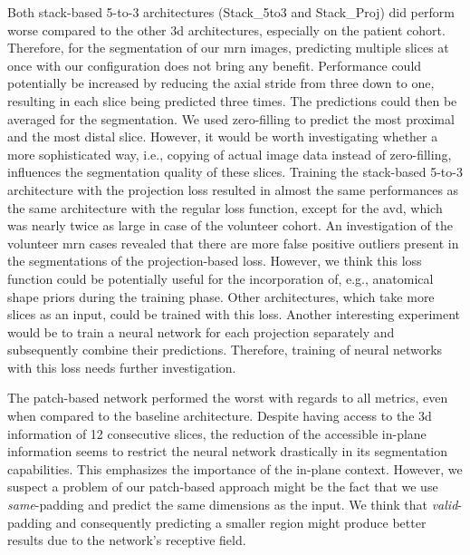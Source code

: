 Both stack-based 5-to-3 architectures (Stack\_5to3 and Stack\_Proj) did perform worse compared to the other \gls{3d} architectures, especially on the patient cohort. Therefore, for the segmentation of our \gls{mrn} images, predicting multiple slices at once with our configuration does not bring any benefit. Performance could potentially be increased by reducing the axial stride from three down to one, resulting in each slice being predicted three times. The predictions could then be averaged for the segmentation. We used zero-filling to predict the most proximal and the most distal slice. However, it would be worth investigating whether a more sophisticated way, i.e., copying of actual image data instead of zero-filling, influences the segmentation quality of these slices.
Training the stack-based 5-to-3 architecture with the projection loss resulted in almost the same performances as the same architecture with the regular loss function, except for the \acrlong{avd}, which was nearly twice as large in case of the volunteer cohort. An investigation of the volunteer \gls{mrn} cases revealed that there are more false positive outliers present in the segmentations of the projection-based loss. However, we think this loss function could be potentially useful for the incorporation of, e.g., anatomical shape priors during the training phase. Other architectures, which take more slices as an input, could be trained with this loss. Another interesting experiment would be to train a neural network for each projection separately and subsequently combine their predictions. Therefore, training of neural networks with this loss needs further investigation.

The patch-based network performed the worst with regards to all metrics, even when compared to the baseline architecture. Despite having access to the \gls{3d} information of 12 consecutive slices, the reduction of the accessible in-plane information seems to restrict the neural network drastically in its segmentation capabilities. This emphasizes the importance of the in-plane context. However, we suspect a problem of our patch-based approach might be the fact that we use \textit{same}-padding and predict the same dimensions as the input. We think that \textit{valid}-padding and consequently predicting a smaller region might produce better results due to the network's receptive field.


